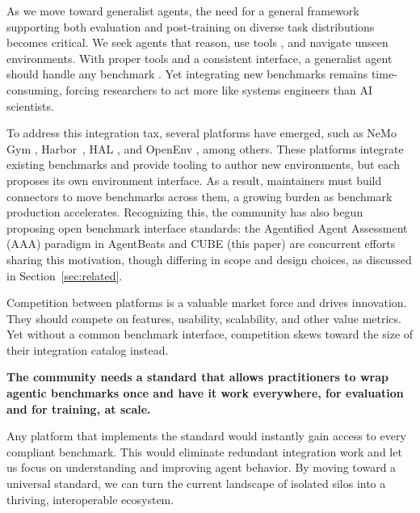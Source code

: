 \documentclass{article}
\theoremstyle{plain}
\theoremstyle{definition}
\theoremstyle{remark}
\begin{document}
As we move toward generalist agents, the need for a general framework supporting both evaluation and post-training on diverse task distributions becomes critical. We seek agents that reason, use tools \citep{Xu2025LLMBasedAF, Shen2024LLMWT}, and navigate unseen environments. With proper tools and a consistent interface, a generalist agent should handle any benchmark \citep{bandel2026agentic}. Yet integrating new benchmarks remains time-consuming, forcing researchers to act more like systems engineers than AI scientists.

To address this integration tax, several platforms have emerged, such as NeMo Gym \citep{nemo-gym}, Harbor~\citep{Shaw_Harbor_Framework_2025}, HAL \citep{kapoor2025holisticagentleaderboardmissing}, and OpenEnv \citep{openenv2025}, among others. These platforms integrate existing benchmarks and provide tooling to author new environments, but each proposes its own environment interface. As a result, maintainers must build connectors to move benchmarks across them, a growing burden as benchmark production accelerates. Recognizing this, the community has also begun proposing open benchmark interface standards: the Agentified Agent Assessment (AAA) paradigm in AgentBeats \citep{agentbeats2025} and CUBE (this paper) are concurrent efforts sharing this motivation, though differing in scope and design choices, as discussed in Section~\ref{sec:related}.

Competition between platforms is a valuable market force and drives innovation. They should compete on features, usability, scalability, and other value metrics. Yet without a common benchmark interface, competition skews toward the size of their integration catalog instead.


\begin{tcolorbox}[
  enhanced,
  colback=royalblue!8,
  colframe=royalblue!90,
  title={\textbf{The Core Position}},
  fonttitle=\bfseries\large,
  coltitle=white,
  arc=1mm,
]
\textbf{The community needs a standard that allows practitioners to wrap agentic benchmarks once and have it work everywhere, for evaluation and for training, at scale.}
\end{tcolorbox}

Any platform that implements the standard would instantly gain access to every compliant benchmark. This would eliminate redundant integration work and let us focus on understanding and improving agent behavior. By moving toward a universal standard, we can turn the current landscape of isolated silos into a thriving, interoperable ecosystem.
\end{document}
